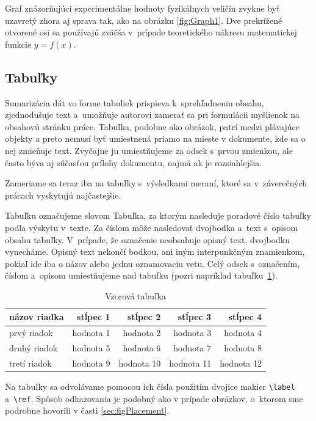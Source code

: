 Graf znázorňujúci experimentálne hodnoty fyzikálnych veličín
zvykne byť uzavretý zhora aj sprava tak,
ako na obrázku \ref{fig:Graph1}.
Dve prekrížené otvorené osi sa používajú zväčša
v~prípade teoretického nákresu matematickej funkcie $y = f(x)$.

\subsection{Tabuľky}
Sumarizácia dát vo forme tabuliek prispieva
k~sprehľadneniu obsahu, zjednodušuje text
a~umožňuje autorovi zamerať sa pri formulácii myšlienok na
obsahovú stránku práce.
Tabuľka, podobne ako obrázok, patrí medzi plávajúce objekty
a preto nemusí byť umiestnená priamo na mieste v dokumente,
kde sa o nej zmieňuje text.
Zvyčajne ju umiestňujeme za odsek s~prvou zmienkou,
ale často býva aj súčasťou prílohy dokumentu,
najmä ak je rozsiahlejšia.

Zameriame sa teraz iba na tabuľky s~výsledkami meraní,
ktoré sa v~záverečných prácach vyskytujú najčastejšie.

Tabuľku označujeme slovom Tabuľka,
za ktorým nasleduje poradové číslo tabuľky podľa výskytu
v~texte.
Za číslom môže nasledovať dvojbodka a~text s~opisom obsahu
tabuľky.
V~prípade, že označenie neobsahuje opisný text,
dvojbodku vynecháme.
Opisný text nekončí bodkou,
ani iným interpunkčným znamienkom,
pokiaľ ide iba o názov alebo jednu oznamovaciu vetu.
Celý odsek s~označením, číslom a~opisom umiestňujeme
nad tabuľku (pozri napríklad tabuľku~\ref{tab:template}).

\begin{table}[h!]
  \caption{Vzorová tabuľka}
  \label{tab:template}
  \centering
  \begin{tabular}{@{}lrrrr@{}}
    \toprule
    \textbf{názov riadka} & \textbf{stĺpec 1} & \textbf{stĺpec 2} & \textbf{stĺpec 3} & \textbf{stĺpec 4} \\
    \midrule
    prvý riadok & hodnota 1 & hodnota 2 & hodnota 3 & hodnota 4\\
    druhý riadok & hodnota 5 & hodnota 6 & hodnota 7 & hodnota 8\\
    tretí riadok & hodnota 9 & hodnota 10 & hodnota 11 & hodnota 12\\
    \bottomrule
  \end{tabular}
\end{table}

Na tabuľky sa odvolávame pomocou ich čísla použitím dvojice makier
\verb|\label| a~\verb|\ref|.
Spôsob odkazovania je podobný ako v prípade obrázkov,
o~ktorom sme podrobne hovorili v časti \ref{sec:figPlacement}.

